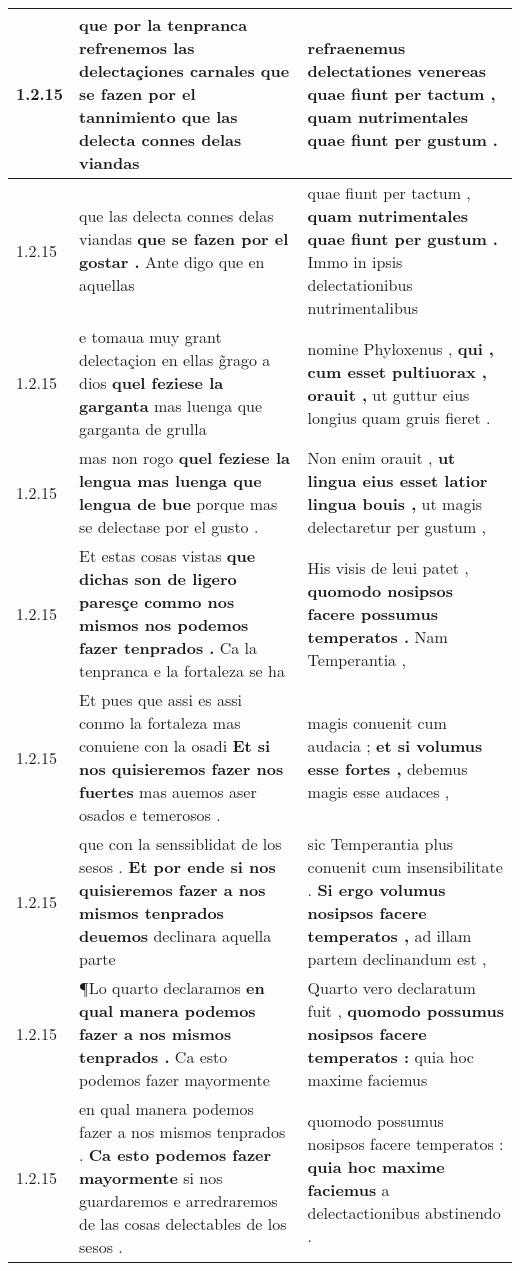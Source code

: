 \begin{tabular}{|p{1cm}|p{6.5cm}|p{6.5cm}|}
1.2.15 & que por la tenpranca refrenemos las delectaçiones carnales \textbf{ que se fazen por el tannimiento } que las delecta connes delas viandas & refraenemus delectationes venereas \textbf{ quae fiunt per tactum , } quam nutrimentales quae fiunt per gustum . \\\hline
1.2.15 & que las delecta connes delas viandas \textbf{ que se fazen por el gostar . } Ante digo que en aquellas & quae fiunt per tactum , \textbf{ quam nutrimentales quae fiunt per gustum . } Immo in ipsis delectationibus nutrimentalibus \\\hline
1.2.15 & e tomaua muy grant delectaçion en ellas g̃rago a dios \textbf{ quel feziese la garganta } mas luenga que garganta de grulla & nomine Phyloxenus , \textbf{ qui , cum esset pultiuorax , orauit , } ut guttur eius longius quam gruis fieret . \\\hline
1.2.15 & mas non rogo \textbf{ quel feziese la lengua mas luenga que lengua de bue } porque mas se delectase por el gusto . & Non enim orauit , \textbf{ ut lingua eius esset latior lingua bouis , } ut magis delectaretur per gustum , \\\hline
1.2.15 & Et estas cosas vistas \textbf{ que dichas son de ligero paresçe commo nos mismos nos podemos fazer tenprados . } Ca la tenpranca e la fortaleza se ha & His visis de leui patet , \textbf{ quomodo nosipsos facere possumus temperatos . } Nam Temperantia , \\\hline
1.2.15 & Et pues que assi es assi conmo la fortaleza mas conuiene con la osadi \textbf{ Et si nos quisieremos fazer nos fuertes } mas auemos aser osados e temerosos . & magis conuenit cum audacia ; \textbf{ et si volumus esse fortes , } debemus magis esse audaces , \\\hline
1.2.15 & que con la senssiblidat de los sesos . \textbf{ Et por ende si nos quisieremos fazer a nos mismos tenprados deuemos } declinara aquella parte & sic Temperantia plus conuenit cum insensibilitate . \textbf{ Si ergo volumus nosipsos facere temperatos , } ad illam partem declinandum est , \\\hline
1.2.15 & ¶Lo quarto declaramos \textbf{ en qual manera podemos fazer a nos mismos tenprados . } Ca esto podemos fazer mayormente & Quarto vero declaratum fuit , \textbf{ quomodo possumus nosipsos facere temperatos : } quia hoc maxime faciemus \\\hline
1.2.15 & en qual manera podemos fazer a nos mismos tenprados . \textbf{ Ca esto podemos fazer mayormente } si nos guardaremos e arredraremos de las cosas delectables de los sesos . & quomodo possumus nosipsos facere temperatos : \textbf{ quia hoc maxime faciemus } a delectactionibus abstinendo . \\\hline

\end{tabular}
